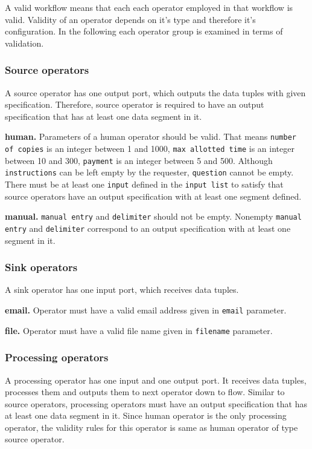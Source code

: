 A valid workflow means that each each operator employed in that workflow is valid. Validity of 
an operator depends on it's type and therefore it's configuration. In the following each operator 
group is examined in terms of validation.

\subsubsection{Source operators}
A source operator has one output port, which outputs the data tuples with given specification. 
Therefore, source operator is required to have an output specification that has at least one data 
segment in it.

\textbf{human.} 
Parameters of a human operator should be valid. That means 
\texttt{number of copies} is an integer between 1 and 1000, 
\texttt{max allotted time} is an integer between 10 and 300, 
\texttt{payment} is an integer between 5 and 500. 
Although \texttt{instructions} can be left empty by the requester, \texttt{question} cannot be 
empty. There must be at least one \texttt{input} defined in the \texttt{input list} to satisfy that 
source operators have an output specification with at least one segment defined.

\textbf{manual.} 
\texttt{manual entry} and \texttt{delimiter} should not be empty. Nonempty \texttt{manual entry} 
and \texttt{delimiter} correspond to an output specification with at least one segment in it.

\subsubsection{Sink operators}
A sink operator has one input port, which receives data tuples.

\textbf{email.} 
Operator must have a valid email address given in \texttt{email} parameter.

\textbf{file.} 
Operator must have a valid file name given in \texttt{filename} parameter.

\subsubsection{Processing operators}
A processing operator has one input and one output port. It receives data tuples, processes 
them and outputs them to next operator down to flow. Similar to source operators, processing 
operators must have an output specification that has at least one data segment in it. Since 
human operator is the only processing operator, the validity rules for this operator is same as 
human operator of type source operator.


